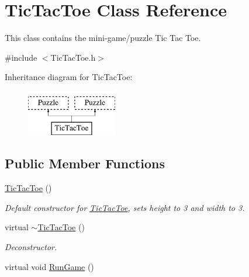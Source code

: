 \hypertarget{classTicTacToe}{\section{Tic\-Tac\-Toe Class Reference}
\label{classTicTacToe}
}


This class contains the mini-\/game/puzzle Tic Tac Toe.  




{\ttfamily \#include $<$Tic\-Tac\-Toe.\-h$>$}

Inheritance diagram for Tic\-Tac\-Toe\-:\begin{figure}[H]
\begin{center}
\leavevmode
\includegraphics[height=2.000000cm]{classTicTacToe}
\end{center}
\end{figure}
\subsection*{Public Member Functions}
\begin{DoxyCompactItemize}
\item 
\hyperlink{classTicTacToe_a103fe9a5ae41b5ef756e20594a70cb7a}{Tic\-Tac\-Toe} ()
\begin{DoxyCompactList}\small\item\em Default constructor for \hyperlink{classTicTacToe}{Tic\-Tac\-Toe}, sets height to 3 and width to 3. \end{DoxyCompactList}\item 
virtual \hyperlink{classTicTacToe_a5e9c4ed3279034d5530cc7b94a3e10e5}{$\sim$\-Tic\-Tac\-Toe} ()
\begin{DoxyCompactList}\small\item\em Deconstructor. \end{DoxyCompactList}\item 
virtual void \hyperlink{classTicTacToe_a811356ea0290bf50ca522c79bead1e05}{Run\-Game} ()
\end{DoxyCompactItemize}
